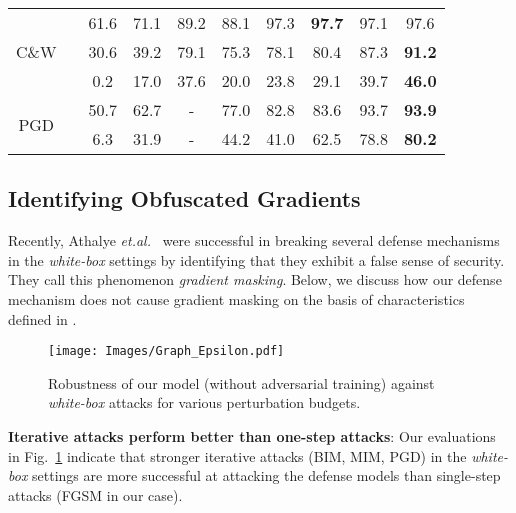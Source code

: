 \documentclass[10pt,twocolumn,letterpaper]{article}
\begin{document}
\begin{table*}[tp]
\begin{center}
{\begin{tabular}{c||c|c|c|c|c|c||c|c|c}
\multirow{3}{*}{C\&W}   &   & 61.6 & 71.1 & 89.2 &88.1 & 97.3 &\cellcolor{yellow!40} \textbf{97.7}& 97.1 & \cellcolor{blue!10} 97.6\\
 &   & 30.6 & 39.2 & 79.1 & 75.3 & 78.1& 80.4&\cellcolor{blue!10} 87.3&\cellcolor{yellow!40} \textbf{91.2}\\
 &   & 0.2 & 17.0 & 37.6 & 20.0 & 23.8 & 29.1 & \cellcolor{blue!10} 39.7&\cellcolor{yellow!40} \textbf{46.0}\\
\hline

\multirow{2}{*}{PGD}   &  & 50.7 & 62.7 &-& 77.0 & 82.8 & 83.6 &\cellcolor{blue!10} 93.7 &\cellcolor{yellow!40} \textbf{93.9}\\
&   & 6.3 & 31.9 &-& 44.2 & 41.0 & 62.5 &\cellcolor{blue!10} 78.8 & \cellcolor{yellow!40} \textbf{80.2}\\
\hline \hline

\end{tabular}}
\vspace{-1.95em}
\end{center}
\end{table*}

\subsection{Identifying Obfuscated Gradients}
Recently, Athalye \textit{et.al.}\ \cite{athalye2018obfuscated} were successful in breaking several defense mechanisms in the \textit{white-box} settings by identifying that they exhibit a false sense of security. They call this phenomenon \textit{gradient masking}. Below, we discuss how our defense mechanism does not cause gradient masking on the basis of characteristics defined in \cite{athalye2018obfuscated, gilmer2018motivating}. 

\begin{figure}
    \centering
{\texttt{[image: Images/Graph\_Epsilon.pdf]} }
   \vspace{-2em}
    \caption{\small{Robustness of our model (without adversarial training) against  \textit{white-box} attacks for various perturbation budgets.}}
    \label{fig:epsilon}\vspace{-0.5em}    
\end{figure}

\noindent
\textbf{Iterative attacks perform better than one-step attacks}: Our evaluations in Fig.~\ref{fig:epsilon} indicate that stronger iterative attacks (\eg BIM, MIM, PGD) in the \textit{white-box} settings are more successful at attacking the defense models than single-step attacks (FGSM in our case). 
\end{document}
